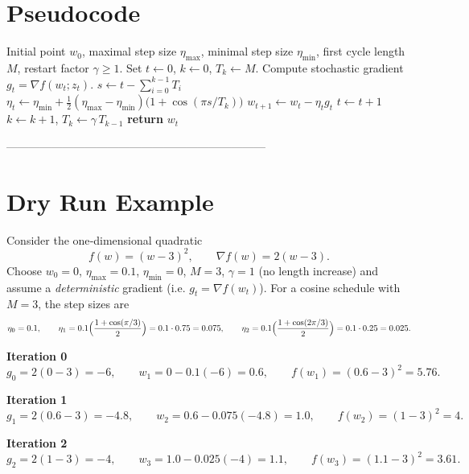 \documentclass{article}
\begin{document}
\section*{Pseudocode}
\begin{algorithm}[H]
\caption{SGDR}
\begin{algorithmic}[1]
\Require Initial point $w_{0}$, maximal step size $\eta_{\max}$,
minimal step size $\eta_{\min}$, first cycle length $M$, restart factor $\gamma\ge1$.
\State Set $t\gets0$, $k\gets0$, $T_{k}\gets M$.
    \State Compute stochastic gradient $g_{t}=\nabla f(w_{t};z_{t})$.
    \State $s\gets t-\sum_{i=0}^{k-1}T_{i}$ 
    \State $\displaystyle \eta_{t}\gets 
        \eta_{\min}+\frac{1}{2}(\eta_{\max}-\eta_{\min})
        \bigl(1+\cos(\pi s/T_{k})\bigr)$          
    \State $w_{t+1}\gets w_{t}-\eta_{t}g_{t}$        
    \State $t\gets t+1$
     
        \State $k\gets k+1$, $T_{k}\gets \gamma\,T_{k-1}$ 
    \EndIf
\EndWhile
\State \textbf{return} $w_{t}$
\end{algorithmic}
\end{algorithm}

---------------------------------------------------------------------

\section*{Dry Run Example}
Consider the one‑dimensional quadratic
\[
f(w)=(w-3)^{2},\qquad \nabla f(w)=2(w-3).
\]
Choose $w_{0}=0$, $\eta_{\max}=0.1$, $\eta_{\min}=0$, $M=3$, $\gamma=1$ (no
length increase) and assume a \emph{deterministic} gradient (i.e. $g_{t}
=\nabla f(w_{t})$).  
For a cosine schedule with $M=3$, the step sizes are
\[
\eta_{0}=0.1,\qquad
\eta_{1}=0.1\Bigl(\frac{1+\cos(\pi/3)}{2}\Bigr)=0.1\cdot0.75=0.075,
\qquad
\eta_{2}=0.1\Bigl(\frac{1+\cos(2\pi/3)}{2}\Bigr)=0.1\cdot0.25=0.025.
\]

\medskip
\noindent\textbf{Iteration 0}
\[
g_{0}=2(0-3)=-6,\qquad
w_{1}=0-0.1(-6)=0.6,\qquad
f(w_{1})=(0.6-3)^{2}=5.76.
\]

\noindent\textbf{Iteration 1}
\[
g_{1}=2(0.6-3)=-4.8,\qquad
w_{2}=0.6-0.075(-4.8)=1.0,\qquad
f(w_{2})=(1-3)^{2}=4.
\]

\noindent\textbf{Iteration 2}
\[
g_{2}=2(1-3)=-4,\qquad
w_{3}=1.0-0.025(-4)=1.1,\qquad
f(w_{3})=(1.1-3)^{2}=3.61.
\]
\end{document}
